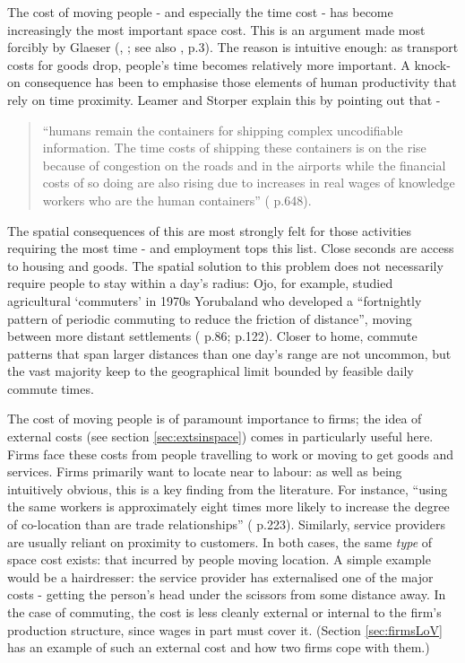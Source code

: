 {The cost of moving people - and especially the time cost - has become increasingly the most important space cost. This is an argument made most forcibly by Glaeser (\citealt{ glaeser_cities_2004}, \citealt{ glaeser_cities_2008}; see also \citealt{beckmann_lectures_2010}, p.3). The reason is intuitive enough: as transport costs for goods drop, people's time becomes relatively more important. A knock-on consequence has been to emphasise those elements of human productivity that rely on time proximity. Leamer and Storper explain this by pointing out that -

\begin{quote}
``humans remain the containers for shipping complex uncodifiable information. The time costs of shipping these containers is on the rise because of congestion on the roads and in the airports while the financial costs of so doing are also rising due to increases in real wages of knowledge workers who are the human containers'' (\citealt{leamer_economy_2001} p.648).  
\end{quote}

The spatial consequences of this are most strongly felt for those activities requiring the most time - and employment tops this list. Close seconds are access to housing and goods. The spatial solution to this problem does not necessarily require people to stay within a day's radius: Ojo, for example, studied agricultural `commuters' in 1970s Yorubaland who developed a ``fortnightly pattern of periodic commuting to reduce the friction of distance'', moving between more distant settlements (\citealt{ojo_journey_1973} p.86; \citealt{chapman_people_1979} p.122). Closer to home, commute patterns that span larger distances than one day's range are not uncommon, but the vast majority keep to the geographical limit bounded by feasible daily commute times.

The cost of moving people is of paramount importance to firms; the idea of external costs (see section \ref{sec:extsinspace}) comes in particularly useful here. Firms face these costs from people travelling to work or moving to get goods and services. Firms primarily want to locate near to labour: as well as being intuitively obvious, this is a key finding from the literature. For instance, ``using the same workers is approximately eight times more likely to increase the degree of co-location than are trade relationships'' (\citealt{glaeser_cities_2004} p.223).  Similarly, service providers are usually reliant on proximity to customers. In both cases, the same \emph{type} of space cost exists: that incurred by people moving location. A simple example would be a hairdresser: the service provider has externalised one of the major costs - getting the person's head under the scissors from some distance away. In the case of commuting, the cost is less cleanly external or internal to the firm's production structure, since wages in part must cover it. (Section \ref{sec:firmsLoV} has an example of such an external cost and how two firms cope with them.)

}
